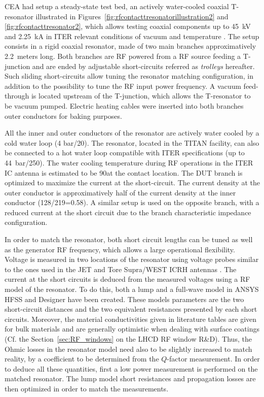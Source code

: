 {CEA had setup a steady-state test bed, an actively water-cooled coaxial T-resonator illustrated in Figures~\ref{fig:rfcontacttresonatorillustration2} and \ref{fig:rfcontacttresonator2}, which allows testing coaxial components up to 45~kV and 2.25~kA in ITER relevant conditions of vacuum and temperature . The setup consists in a rigid coaxial resonator, made of two main branches approximatively 2.2~meters long. Both branches are RF powered from a RF source feeding a T-junction and are ended by adjustable short-circuits referred as \textit{trolleys} hereafter. Such sliding short-circuits allow tuning the resonator matching configuration, in addition to the possibility to tune the RF input power frequency. A vacuum feed-through is located upstream of the T-junction, which allows the T-resonator to be vacuum pumped. Electric heating cables were inserted into both branches outer conductors for baking purposes. 

All the inner and outer conductors of the resonator are actively water cooled by a cold water loop (4 bar/20\degC). The resonator, located in the TITAN facility, can also be connected to a hot water loop compatible with ITER specifications (up to 44~bar/250\degC). The water cooling temperature during RF operations in the ITER IC antenna is estimated to be 90\degC at the contact location. The DUT branch is optimized to maximize the current at the short-circuit. The current density at the outer conductor is approximatively half of the current density at the inner conductor (128/219=0.58). A similar setup is used on the opposite branch, with a reduced current at the short circuit due to the branch characteristic impedance configuration.

In order to match the resonator, both short circuit lengths can be tuned as well as the generator RF frequency, which allows a large operational flexibility. Voltage is measured in two locations of the resonator using voltage probes similar to the ones used in the JET and Tore Supra/WEST ICRH antennas . The current at the short circuits is deduced from the measured voltages using a RF model of the resonator. To do this, both a lump and a full-wave model in ANSYS HFSS and Designer have been created. These models parameters are the two short-circuit distances and the two equivalent resistances presented by each short circuits. Moreover, the material conductivities given in literature tables are given for bulk materials and are generally optimistic when dealing with surface coatings (Cf. the Section~\ref{sec:RF_windows} on the LHCD RF window R\&D). Thus, the Ohmic losses in the resonator model need also to be slightly increased to match reality, by a coefficient to be determined from the $Q$-factor measurement. In order to deduce all these quantities, first a low power measurement is performed on the matched resonator. The lump model short resistances and propagation losses are then optimized in order to match the measurements. 

}
